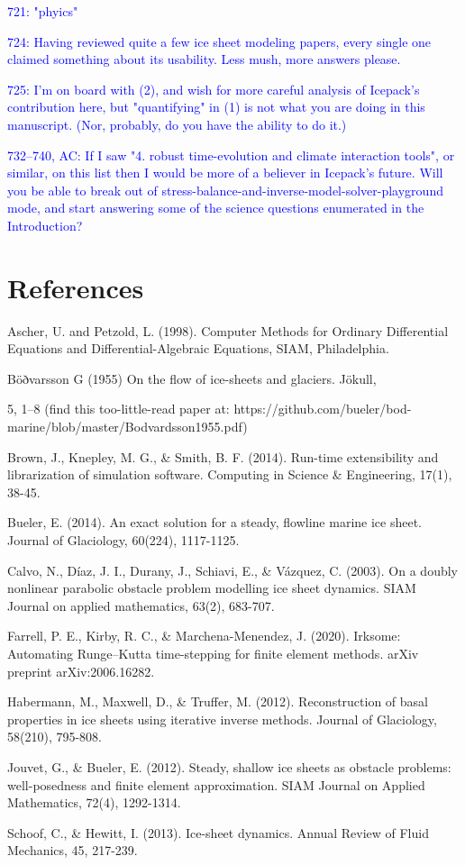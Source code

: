 \documentclass{article}
\theoremstyle{definition}
\theoremstyle{plain}
\begin{document}
\textcolor{blue}{721:  "phyics"}

\textcolor{blue}{724:  Having reviewed quite a few ice sheet modeling papers, every single one claimed something about its usability.  Less mush, more answers please.}

\textcolor{blue}{725:  I'm on board with (2), and wish for more careful analysis of Icepack's contribution here, but "quantifying" in (1) is not what you are doing in this manuscript.  (Nor, probably, do you have the ability to do it.)}

\textcolor{blue}{732--740, AC:  If I saw "4. robust time-evolution and climate interaction tools", or similar, on this list then I would be more of a believer in Icepack's future.  Will you be able to break out of stress-balance-and-inverse-model-solver-playground mode, and start answering some of the science questions enumerated in the Introduction?}



\section*{References}

Ascher, U. and Petzold, L. (1998). Computer Methods for Ordinary Differential Equations and Differential-Algebraic Equations, SIAM, Philadelphia.

Böðvarsson G (1955) On the flow of ice-sheets and glaciers. Jökull,

5, 1–8 (find this too-little-read paper at: https://github.com/bueler/bod-marine/blob/master/Bodvardsson1955.pdf)

Brown, J., Knepley, M. G., \& Smith, B. F. (2014). Run-time extensibility and librarization of simulation software. Computing in Science \& Engineering, 17(1), 38-45.

Bueler, E. (2014). An exact solution for a steady, flowline marine ice sheet. Journal of Glaciology, 60(224), 1117-1125.

Calvo, N., Díaz, J. I., Durany, J., Schiavi, E., \& Vázquez, C. (2003). On a doubly nonlinear parabolic obstacle problem modelling ice sheet dynamics. SIAM Journal on applied mathematics, 63(2), 683-707.

Farrell, P. E., Kirby, R. C., \& Marchena-Menendez, J. (2020). Irksome: Automating Runge--Kutta time-stepping for finite element methods. arXiv preprint arXiv:2006.16282.

Habermann, M., Maxwell, D., \& Truffer, M. (2012). Reconstruction of basal properties in ice sheets using iterative inverse methods. Journal of Glaciology, 58(210), 795-808.

Jouvet, G., \& Bueler, E. (2012). Steady, shallow ice sheets as obstacle problems: well-posedness and finite element approximation. SIAM Journal on Applied Mathematics, 72(4), 1292-1314.

Schoof, C., \& Hewitt, I. (2013). Ice-sheet dynamics. Annual Review of Fluid Mechanics, 45, 217-239.
\end{document}
